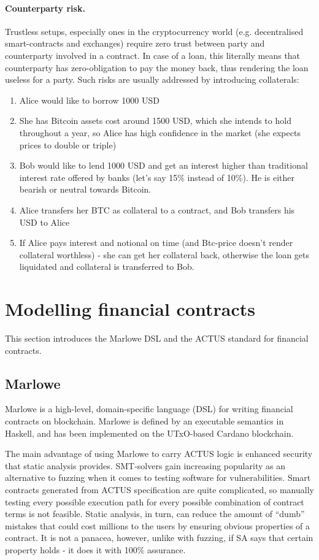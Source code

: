 \documentclass[runningheads]{llncs}
\begin{document}
\paragraph*{Counterparty risk.}

Trustless setups, especially ones in the cryptocurrency world (e.g.
decentralised smart-contracts and exchanges) require zero trust between
party and counterparty involved in a contract. In case of a loan,
this literally means that counterparty has zero-obligation to pay
the money back, thus rendering the loan useless for a party. Such
risks are usually addressed by introducing collaterals: 
\begin{enumerate}
\item Alice would like to borrow 1000 USD 
\item She has Bitcoin assets cost around 1500 USD, which she intends to
hold throughout a year, so Alice has high confidence in the market
(she expects prices to double or triple) 
\item Bob would like to lend 1000 USD and get an interest higher than traditional
interest rate offered by banks (let's say 15\% instead of 10\%). He
is either bearish or neutral towards Bitcoin. 
\item Alice transfers her BTC as collateral to a contract, and Bob transfers
his USD to Alice 
\item If Alice pays interest and notional on time (and Btc-price doesn't
render collateral worthless) - she can get her collateral back, otherwise
the loan gets liquidated and collateral is transferred to Bob. 
\end{enumerate}

\section{Modelling financial contracts}
\label{modelling}

This section introduces the Marlowe DSL and the ACTUS standard for financial contracts.

\subsection{Marlowe}

Marlowe is a high-level, domain-specific language (DSL) for writing
financial contracts on blockchain\cite{marlowe}. Marlowe is defined
by an executable semantics in Haskell, and has been implemented on
the UTxO-based Cardano blockchain.

The main advantage of using Marlowe to carry ACTUS logic is enhanced
security that static analysis provides. SMT-solvers gain increasing
popularity as an alternative to fuzzing when it comes to testing software
for vulnerabilities\cite{smt}. Smart contracts generated from ACTUS
specification are quite complicated, so manually testing every possible
execution path for every possible combination of contract terms is
not feasible. Static analysis, in turn, can reduce the amount of ``dumb''
mistakes that could cost millions to the users by ensuring obvious
properties of a contract. It is not a panacea, however, unlike with
fuzzing, if SA says that certain property holds - it does it with
100\% assurance.
\end{document}
